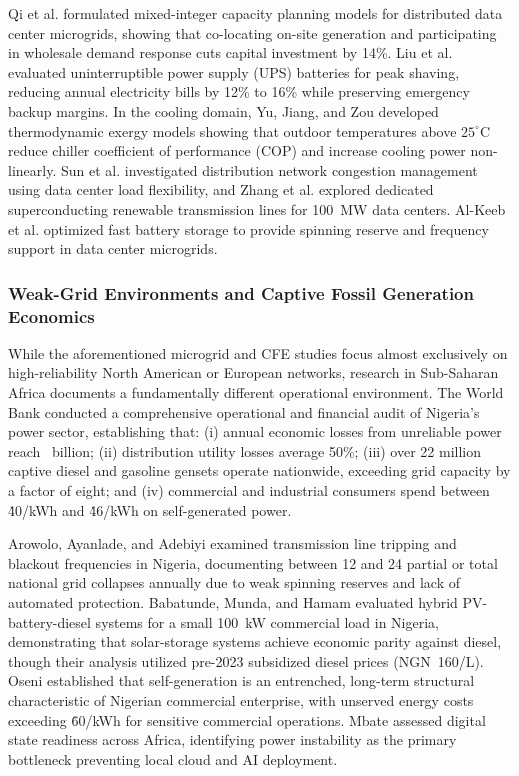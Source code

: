 \documentclass[11pt,a4paper]{article}
\begin{document}
Qi et al. \cite{Qi2019} formulated mixed-integer capacity planning models for distributed data center microgrids, showing that co-locating on-site generation and participating in wholesale demand response cuts capital investment by 14\%. Liu et al. \cite{Liu2022} evaluated uninterruptible power supply (UPS) batteries for peak shaving, reducing annual electricity bills by 12\% to 16\% while preserving emergency backup margins. In the cooling domain, Yu, Jiang, and Zou \cite{Yu2021} developed thermodynamic exergy models showing that outdoor temperatures above $25^\circ\text{C}$ reduce chiller coefficient of performance (COP) and increase cooling power non-linearly. Sun et al. \cite{Sun2021} investigated distribution network congestion management using data center load flexibility, and Zhang et al. \cite{Zhang2022} explored dedicated superconducting renewable transmission lines for 100~MW data centers. Al-Keeb et al. \cite{AlKeeb2023} optimized fast battery storage to provide spinning reserve and frequency support in data center microgrids.

\subsubsection{Weak-Grid Environments and Captive Fossil Generation Economics}
While the aforementioned microgrid and CFE studies focus almost exclusively on high-reliability North American or European networks, research in Sub-Saharan Africa documents a fundamentally different operational environment. The World Bank \cite{WorldBank2020} conducted a comprehensive operational and financial audit of Nigeria's power sector, establishing that: (i) annual economic losses from unreliable power reach \ billion; (ii) distribution utility losses average 50\%; (iii) over 22 million captive diesel and gasoline gensets operate nationwide, exceeding grid capacity by a factor of eight; and (iv) commercial and industrial consumers spend between \.40/kWh and \.46/kWh on self-generated power.

Arowolo, Ayanlade, and Adebiyi \cite{Arowolo2022} examined transmission line tripping and blackout frequencies in Nigeria, documenting between 12 and 24 partial or total national grid collapses annually due to weak spinning reserves and lack of automated protection. Babatunde, Munda, and Hamam \cite{Babatunde2020} evaluated hybrid PV-battery-diesel systems for a small 100~kW commercial load in Nigeria, demonstrating that solar-storage systems achieve economic parity against diesel, though their analysis utilized pre-2023 subsidized diesel prices (NGN~160/L). Oseni \cite{Oseni2012} established that self-generation is an entrenched, long-term structural characteristic of Nigerian commercial enterprise, with unserved energy costs exceeding \.60/kWh for sensitive commercial operations. Mbate \cite{Mbate2024} assessed digital state readiness across Africa, identifying power instability as the primary bottleneck preventing local cloud and AI deployment.
\end{document}
